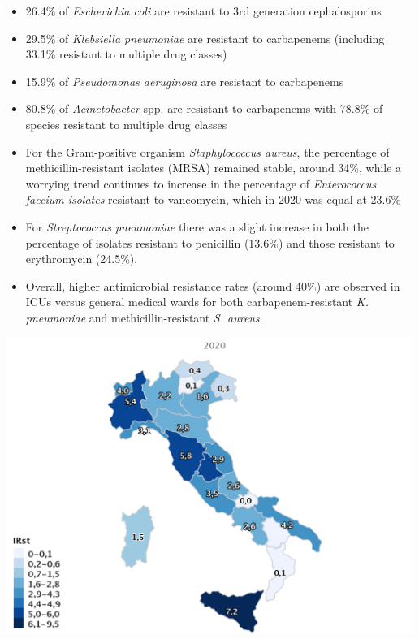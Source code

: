 \documentclass[
]{book}
\providecommand{\tightlist}{%
  \setlength{\itemsep}{0pt}\setlength{\parskip}{0pt}}
\begin{document}
\begin{itemize}
\tightlist
\item
  26.4\% of \emph{Escherichia coli} are resistant to 3rd generation cephalosporins
\item
  29.5\% of \emph{Klebsiella pneumoniae} are resistant to carbapenems (including 33.1\% resistant to multiple drug classes)
\item
  15.9\% of \emph{Pseudomonas aeruginosa} are resistant to carbapenems
\item
  80.8\% of \emph{Acinetobacter} spp. are resistant to carbapenems with 78.8\% of species resistant to multiple drug classes
\item
  For the Gram-positive organism \emph{Staphylococcus aureus}, the percentage of methicillin-resistant isolates (MRSA) remained stable, around 34\%, while a worrying trend continues to increase in the percentage of \emph{Enterococcus faecium isolates} resistant to vancomycin, which in 2020 was equal at 23.6\%
\item
  For \emph{Streptococcus pneumoniae} there was a slight increase in both the percentage of isolates resistant to penicillin (13.6\%) and those resistant to erythromycin (24.5\%).
\item
  Overall, higher antimicrobial resistance rates (around 40\%) are observed in ICUs versus general medical wards for both carbapenem-resistant \emph{K. pneumoniae} and methicillin-resistant \emph{S. aureus}.
\end{itemize}

\includegraphics[width=5.20833in,height=\textheight]{images/Italia_CRE.png}
\end{document}
